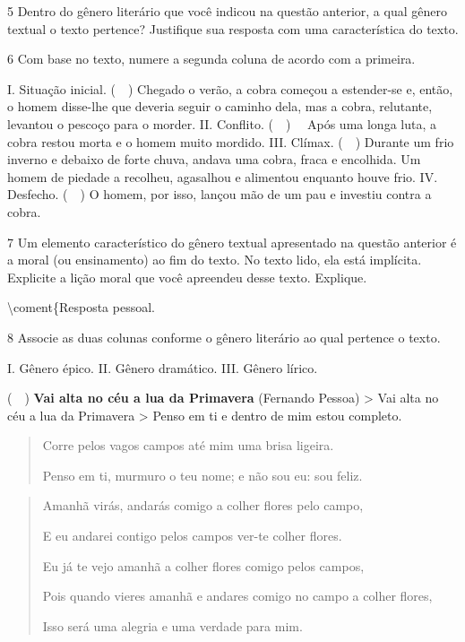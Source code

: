 
\num{5} Dentro do gênero literário que você indicou na questão anterior,
a qual gênero textual o texto pertence? Justifique sua resposta com uma
característica do texto.


\num{6} Com base no texto, numere a segunda coluna de acordo com a
primeira.

I. Situação inicial. (~~) Chegado o verão, a cobra começou a
estender-se e, então, o homem disse-lhe que deveria seguir o caminho
dela, mas a cobra, relutante, levantou o pescoço para o morder. II.
Conflito. (~~) ~~Após uma longa luta, a cobra restou morta e
o homem muito mordido. III. Clímax. (~~) Durante um frio
inverno e debaixo de forte chuva, andava uma cobra, fraca e encolhida.
Um homem de piedade a recolheu, agasalhou e alimentou enquanto houve
frio. IV. Desfecho. (~~) O homem, por isso, lançou mão de um
pau e investiu contra a cobra.

\num{7} Um elemento característico do gênero textual apresentado na
questão anterior é a moral (ou ensinamento) ao fim do texto. No texto
lido, ela está implícita. Explicite a lição moral que você apreendeu
desse texto. Explique.


\textbackslash coment\{Resposta pessoal.

\num{8} Associe as duas colunas conforme o gênero literário ao qual
pertence o texto.

I. Gênero épico. II. Gênero dramático. III. Gênero lírico.

(~~) \textbf{Vai alta no céu a lua da Primavera} (Fernando
Pessoa) \textgreater{} Vai alta no céu a lua da Primavera \textgreater{}
Penso em ti e dentro de mim estou completo.

\begin{quote}
Corre pelos vagos campos até mim uma brisa ligeira.

Penso em ti, murmuro o teu nome; e não sou eu: sou feliz.
\end{quote}

\begin{quote}
Amanhã virás, andarás comigo a colher flores pelo campo,

E eu andarei contigo pelos campos ver-te colher flores.

Eu já te vejo amanhã a colher flores comigo pelos campos,

Pois quando vieres amanhã e andares comigo no campo a colher flores,

Isso será uma alegria e uma verdade para mim.
\end{quote}

